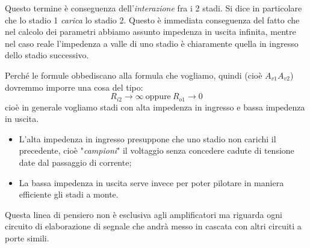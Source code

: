 \documentclass[a4paper,11pt]{article}
\begin{document}
Questo termine è conseguenza dell'\textit{interazione} fra i 2 stadi. Si dice in particolare che lo stadio 1 \textit{carica} lo stadio 2. Questo è immediata conseguenza del fatto che nel calcolo dei parametri abbiamo assunto impedenza in uscita infinita, mentre nel caso reale l'impedenza a valle di uno stadio è chiaramente quella in ingresso dello stadio successivo.

Perché le formule obbediscano alla formula che vogliamo, quindi (cioè $A_{v1} A_{v2}$) dovremmo imporre una cosa del tipo:
$$
R_{i2} \rightarrow \infty \ \text{oppure} \ R_{o1} \rightarrow 0
$$
cioè in generale vogliamo stadi con alta impedenza in ingresso e bassa impedenza in uscita.
\begin{itemize}
	\item L'alta impedenza in ingresso presuppone che uno stadio non carichi il precedente, cioè "\textit{campioni}" il voltaggio senza concedere cadute di tensione date dal passaggio di corrente;
	\item La bassa impedenza in uscita serve invece per poter pilotare in maniera efficiente gli stadi a monte.
\end{itemize}

Questa linea di pensiero non è esclusiva agli amplificatori ma riguarda ogni circuito di elaborazione di segnale che andrà messo in cascata con altri circuiti a porte simili.
\end{document}

